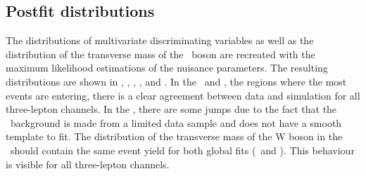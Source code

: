 \clearpage

\subsection{Postfit distributions}
 The distributions of multivariate discriminating  variables as well as the distribution of the transverse mass of the \PW\ boson are recreated with the maximum likelihood estimations of the nuisance parameters. The resulting distributions are shown in  , , , , and . 
 In the \WZCR\ and \TTSR, the regions where the most events  are entering, there is a clear agreement between data and simulation for all three-lepton channels. In the \STSR, there are some jumps due to the fact that the \NPL\ background is made from a limited data sample and does not have a smooth template to fit. The distribution of the transverse mass of the W boson in the \WZCR\ should contain the same event yield for both global fits (\Zut\ and \Zct). This behaviour is visible for all three-lepton channels. 


